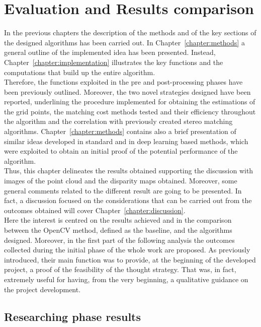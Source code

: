 \chapter{Evaluation and Results comparison}
\label{chapter:evaluation}

In the previous chapters the description of the methods and of the key sections of the designed algorithms has been carried out.
In Chapter~\ref{chapter:methods} a general outline of the implemented idea has been presented.
Instead, Chapter~\ref{chapter:implementation} illustrates the key functions and the computations that build up the entire algorithm.\\
Therefore, the functions exploited in the pre and post-processing phases have been previously outlined. 
Moreover, the two novel strategies designed have been reported, underlining the procedure implemented for obtaining the estimations of the grid points, the matching cost methods tested and their efficiency throughout the algorithm and the correlation with previously created stereo matching algorithms. 
Chapter~\ref{chapter:methods} contains also a brief presentation of similar ideas developed in standard and in deep learning based methods, which were exploited to obtain an initial proof of the potential performance of the algorithm.\\
Thus, this chapter delineates the results obtained supporting the discussion with images of the point cloud and the disparity maps obtained.
Moreover, some general comments related to the different result are going to be presented.
In fact, a discussion focused on the considerations that can be carried out from the outcomes obtained will cover Chapter~\ref{chapter:discussion}.\\
Here the interest is centred on the results achieved and in the comparison between the OpenCV method, defined as the baseline, and the algorithms designed.
Moreover, in the first part of the following analysis the outcomes collected during the initial phase of the whole work are proposed.
As previously introduced, their main function was to provide, at the beginning of the developed project, a proof of the feasibility of the thought strategy. 
That was, in fact, extremely useful for having, from the very beginning, a qualitative guidance on the project development. 

\section{Researching phase results}
\label{section:research-phase-results}

